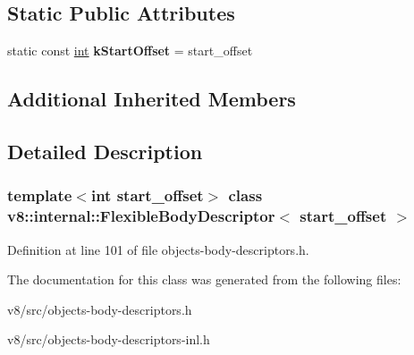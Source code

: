 \subsection*{Static Public Attributes}
\begin{DoxyCompactItemize}
\item 
\mbox{\label{classv8_1_1internal_1_1FlexibleBodyDescriptor_a27ad85d165e2d35360cf5150db132825}} 
static const \mbox{\hyperlink{classint}{int}} {\bfseries k\+Start\+Offset} = start\+\_\+offset
\end{DoxyCompactItemize}
\subsection*{Additional Inherited Members}


\subsection{Detailed Description}
\subsubsection*{template$<$int start\+\_\+offset$>$\newline
class v8\+::internal\+::\+Flexible\+Body\+Descriptor$<$ start\+\_\+offset $>$}



Definition at line 101 of file objects-\/body-\/descriptors.\+h.



The documentation for this class was generated from the following files\+:\begin{DoxyCompactItemize}
\item 
v8/src/objects-\/body-\/descriptors.\+h\item 
v8/src/objects-\/body-\/descriptors-\/inl.\+h\end{DoxyCompactItemize}
